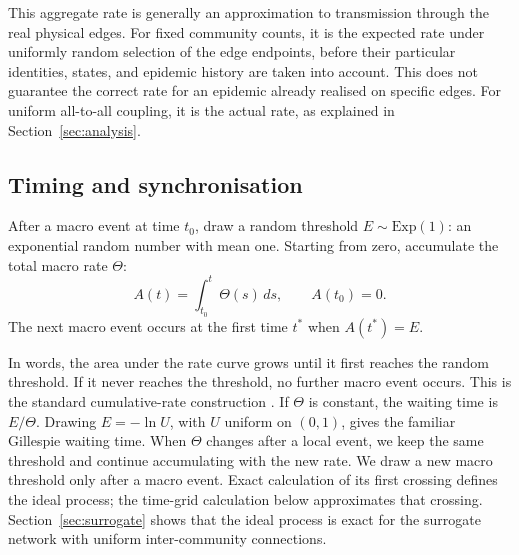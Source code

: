 \documentclass[a4paper,fleqn]{cas-sc}
\newcommand{\Exp}{\mathrm{Exp}}
\begin{document}
This aggregate rate is generally an approximation to transmission through the real physical edges. For fixed community counts, it is the expected rate under uniformly random selection of the edge endpoints, before their particular identities, states, and epidemic history are taken into account. This does not guarantee the correct rate for an epidemic already realised on specific edges. For uniform all-to-all coupling, it is the actual rate, as explained in Section~\ref{sec:analysis}.

\subsection{Timing and synchronisation}
\label{sec:timing}

After a macro event at time $t_0$, draw a random threshold $E\sim\Exp(1)$: an exponential random number with mean one. Starting from zero, accumulate the total macro rate $\Theta$:
\begin{equation}
\label{eq:hazard_integral}
A(t)=\int_{t_0}^{t}\Theta(s)\,ds,
\qquad A(t_0)=0.
\end{equation}
The next macro event occurs at the first time $t^\ast$ when $A(t^\ast)=E$.

In words, the area under the rate curve grows until it first reaches the random threshold. If it never reaches the threshold, no further macro event occurs. This is the standard cumulative-rate construction \citep{ethier1986,anderson2007}. If $\Theta$ is constant, the waiting time is $E/\Theta$. Drawing $E=-\ln U$, with $U$ uniform on $(0,1)$, gives the familiar Gillespie waiting time. When $\Theta$ changes after a local event, we keep the same threshold and continue accumulating with the new rate. We draw a new macro threshold only after a macro event. Exact calculation of its first crossing defines the ideal process; the time-grid calculation below approximates that crossing. Section~\ref{sec:surrogate} shows that the ideal process is exact for the surrogate network with uniform inter-community connections.
\end{document}
